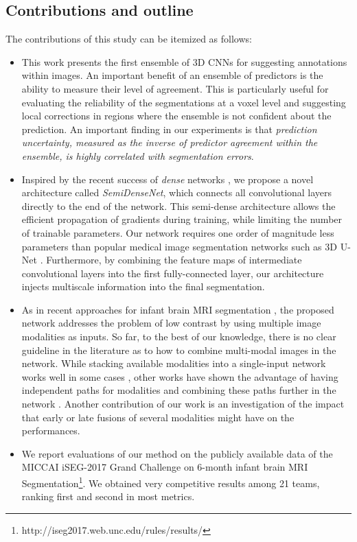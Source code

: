 \documentclass[twoside,espcrc2]{elsarticle}
\begin{document}
\subsection{Contributions and outline}
\label{ssec:contributions}

The contributions of this study can be itemized as follows:

\begin{itemize}

\item This work presents the first ensemble of 3D CNNs for suggesting annotations within images. 
An important benefit of an ensemble of predictors is the ability to measure their level of agreement. This is particularly useful for evaluating the reliability of the segmentations at a voxel level and suggesting local corrections in regions where the ensemble is not confident about the prediction. An important finding in our experiments is that {\em prediction uncertainty, measured as the inverse of predictor agreement within the ensemble, is highly correlated with segmentation errors}.

\item Inspired by the recent success of {\em dense} networks \cite{huang2016densely}, we propose a novel architecture called \emph{SemiDenseNet}, which connects all convolutional layers directly to the end of the network. This semi-dense architecture allows the efficient propagation of gradients during training, while limiting the number of trainable parameters. Our network requires one order of magnitude less parameters than popular medical image segmentation networks such as 3D U-Net \cite{cciccek20163d}. Furthermore, by combining the feature maps of intermediate convolutional layers into the first fully-connected layer, our architecture injects multiscale information into the final segmentation. 

\item As in recent approaches for infant brain MRI segmentation \cite{zhang2015deep,nie2016fully}, the proposed network addresses the problem of low contrast by using multiple image modalities as inputs. So far, to the best of our knowledge, there is no clear guideline in the literature as to how to combine multi-modal images in the network. While stacking available modalities into a single-input network works well in some cases \cite{zhang2015deep}, other works have shown the advantage of having independent paths for modalities and combining these paths further in the network \cite{nie2016fully}. Another contribution of our work is an  investigation of the impact that early or late fusions of several modalities might have on the performances. 

\item We report evaluations of our method on the publicly available data of the MICCAI iSEG-2017 Grand Challenge on 6-month infant brain MRI Segmentation\footnote{http://iseg2017.web.unc.edu/rules/results/}. We obtained very competitive results among 21 teams, ranking first and second in most metrics.






\end{itemize}
\end{document}
